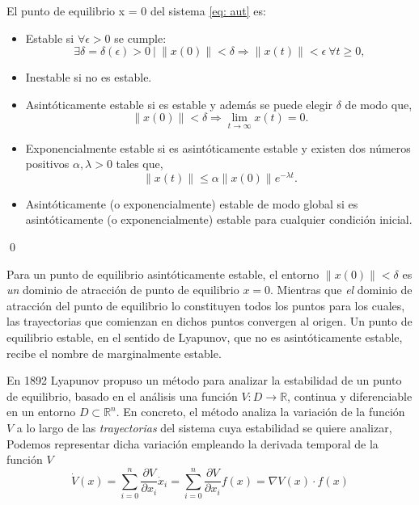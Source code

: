 \begin{definition} \label{def: est}
El punto de equilibrio x = 0 del sistema \ref{eq: aut} es:
\begin{itemize}
\item Estable si $\forall \epsilon > 0$ se cumple:
\begin{equation*}
 \exists \delta =\delta(\epsilon)>0\  \vert\  \| x(0) \| < \delta \Rightarrow \| x(t)\| < \epsilon \ \forall t \ge 0,
\end{equation*}
 \item Inestable si no es estable.
 \item Asintóticamente estable si es estable y además se puede elegir $\delta$ de modo que,
\begin{equation*}
\| x(0)\| < \delta \Rightarrow \lim_{t \to \infty} x(t) = 0.
\end{equation*}

\item Exponencialmente estable si es asintóticamente estable y existen dos números positivos $\alpha , \lambda >0$ tales que,
\begin{equation*}
\| x(t) \| \leq \alpha\| x(0) \| e^{-\lambda t}. 
\end{equation*} 

\item Asintóticamente (o exponencialmente) estable de modo global si es asintóticamente (o exponencialmente) estable para cualquier condición inicial.
\end{itemize} 
\qed
\end{definition}


Para un punto de equilibrio asintóticamente estable, el entorno $\|x(0)\| < \delta$ es   \emph{un} dominio de atracción de punto de equilibrio $x = 0$. Mientras que \emph{el} dominio de atracción del punto de equilibrio lo constituyen todos los puntos para los cuales, las trayectorias que comienzan en dichos puntos convergen al origen. Un punto de equilibrio estable, en el sentido de Lyapunov, que no es asintóticamente estable, recibe el nombre de marginalmente estable.



En 1892 Lyapunov propuso un método para analizar la estabilidad de un punto de equilibrio, basado en el análisis  una función $V:D\to \mathbb{R}$, continua y diferenciable en un entorno $D \subset \mathbb{R}^n$. En concreto, el método analiza la variación de la función $V$ a lo largo de las \emph{trayectorias} del sistema cuya estabilidad se quiere analizar, Podemos representar dicha variación empleando la derivada temporal de la función $V$
\begin{equation} \label{eq: dlyap}
\dot V(x) = \sum_{i=0}^{n}\frac{\partial V}{\partial x_i} \dot x_i = \sum_{i=0}^{n}\frac{\partial V}{\partial x_i} f(x) = \nabla V(x)\cdot f(x)
\end{equation}

